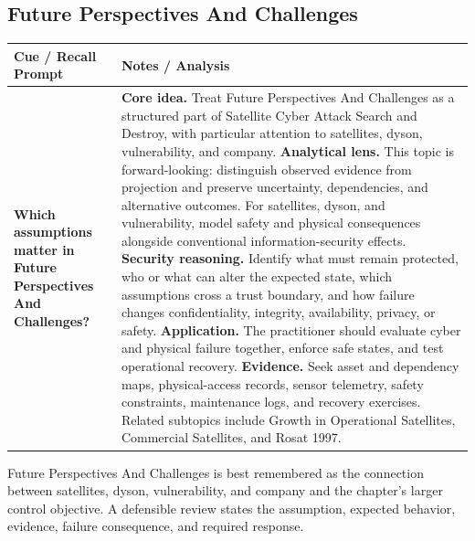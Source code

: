 \documentclass[11pt]{article}
\newcommand{\CornellHeader}{%
\rowcolor{Navy}\color{white}\bfseries Cue / Recall Prompt & \color{white}\bfseries Notes / Analysis\\\hline}
\newcommand{\CornellRow}[2]{%
\cellcolor{CueGray}\RaggedRight\textbf{#1} & \RaggedRight #2\\\hline}
\begin{document}
\subsection*{Future Perspectives And Challenges}
\begin{longtable}{>{\RaggedRight\arraybackslash}p{}|>{\RaggedRight\arraybackslash}p{}}
\CornellHeader
\CornellRow{Which assumptions matter in Future Perspectives And Challenges?}{\textbf{Core idea.} Treat Future Perspectives And Challenges as a structured part of Satellite Cyber Attack Search and Destroy, with particular attention to satellites, dyson, vulnerability, and company. \textbf{Analytical lens.} This topic is forward-looking: distinguish observed evidence from projection and preserve uncertainty, dependencies, and alternative outcomes. For satellites, dyson, and vulnerability, model safety and physical consequences alongside conventional information-security effects. \textbf{Security reasoning.} Identify what must remain protected, who or what can alter the expected state, which assumptions cross a trust boundary, and how failure changes confidentiality, integrity, availability, privacy, or safety. \textbf{Application.} The practitioner should evaluate cyber and physical failure together, enforce safe states, and test operational recovery. \textbf{Evidence.} Seek asset and dependency maps, physical-access records, sensor telemetry, safety constraints, maintenance logs, and recovery exercises. Related subtopics include Growth in Operational Satellites, Commercial Satellites, and Rosat 1997.}
\end{longtable}
\begin{topicsummary}
Future Perspectives And Challenges is best remembered as the connection between satellites, dyson, vulnerability, and company and the chapter's larger control objective. A defensible review states the assumption, expected behavior, evidence, failure consequence, and required response.
\end{topicsummary}
\end{document}
